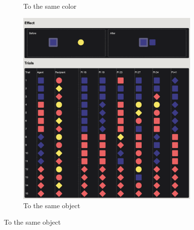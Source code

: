 \documentclass{article}
\begin{document}
\begin{figure}[b]
\begin{subfigure}[t]{0.31\textwidth}
  	\caption{To the same color} \label{fig:group03}
  \end{subfigure}
  \hfill
  \begin{subfigure}[t]{0.31\textwidth}
  	\centering
  	\includegraphics[width=\linewidth]{group06} 
  	\caption{To the same object} \label{fig:group06}
  \end{subfigure}


\end{figure}
\end{document}
